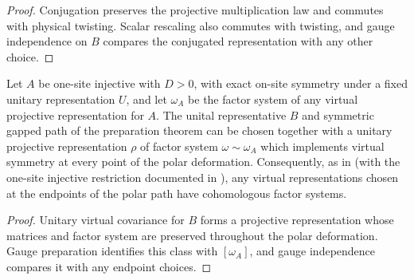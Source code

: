 \begin{proof}\leanok
    Conjugation preserves the projective multiplication law and commutes
    with physical twisting. Scalar rescaling also commutes with twisting,
    and gauge independence on $B$ compares the conjugated representation
    with any other choice.
\end{proof}

\begin{lemma}
    \label{thm:spt_prepared_polar_virtual_class}
    \leanok

    Let $A$ be one-site injective with $D>0$, with exact on-site symmetry
    under a fixed unitary representation $U$, and let $\omega_A$ be the
    factor system of any virtual projective representation for $A$.
    The unital representative $B$ and symmetric gapped path of the
    preparation theorem can be chosen together with a unitary projective
    representation $\rho$ of factor system $\omega\sim\omega_A$ which
    implements virtual symmetry at every point of the polar deformation.
    Consequently, as in \cite[Sections~II.C and II.F.2]{Schuch2011Phases}
    (with the one-site injective restriction documented in
    \cite{gap:spc11_uniform_gap_injective_scope}), any virtual
    representations chosen at the endpoints of the polar path have
    cohomologous factor systems.
\end{lemma}

\begin{proof}\leanok
    Unitary virtual covariance for $B$ forms a projective representation
    whose matrices and factor system are preserved throughout the polar
    deformation. Gauge preparation identifies this class with $[\omega_A]$,
    and gauge independence compares it with any endpoint choices.
\end{proof}

